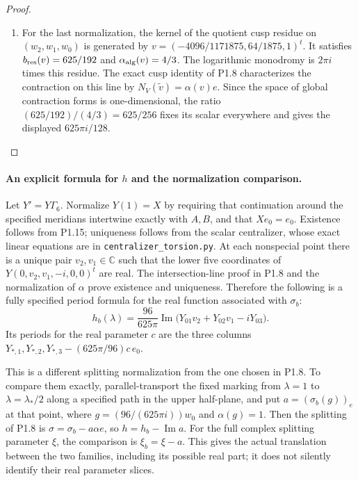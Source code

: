 \documentclass[11pt,a4paper]{article}
\theoremstyle{definition}
\begin{document}
\begin{proof}
\begin{enumerate}[label=\arabic*.]
\item For the last normalization, the kernel of the quotient cusp residue
on $(w_2,w_1,w_0)$ is generated by
$v=(-4096/1171875,64/1875,1)^t$.
It satisfies $b_{\rm res}(v)=625/192$ and
$\alpha_{\rm alg}(v)=4/3$.
The logarithmic monodromy is $2\pi i$ times this residue.
The exact cusp identity of P1.8 characterizes the contraction on this
line by $N_V(\widetilde v)=\alpha(v)e$.
Since the space of global contraction forms is one-dimensional, the
ratio $(625/192)/(4/3)=625/256$ fixes its scalar everywhere and gives
the displayed $625\pi i/128$.

\end{enumerate}
\end{proof}


\paragraph{An explicit formula for $h$ and the normalization comparison.}
Let $Y'=Y\Gamma_6$.  Normalize $Y(1)=X$ by requiring that continuation
around the specified meridians intertwine exactly with $A,B$, and that
$Xe_0=e_0$.  Existence follows from P1.15; uniqueness follows from the
scalar centralizer, whose exact linear equations are in
\texttt{centralizer\_torsion.py}.
At each nonspecial point there is a unique pair $v_2,v_1\in\mathbb C$
such that the lower five coordinates of
$Y(0,v_2,v_1,-i,0,0)^t$ are real.
The intersection-line proof in P1.8 and the normalization of $\alpha$
prove existence and uniqueness.  Therefore the following is a fully
specified period formula for the real function associated with
$\sigma_b$:
\[
h_b(\lambda)=\frac{96}{625\pi}
 \operatorname{Im}\bigl(Y_{01}v_2+Y_{02}v_1-iY_{03}\bigr).
\tag{1.15.3}
\]
Its periods for the real parameter $c$ are the three columns
$Y_{*,1},Y_{*,2},Y_{*,3}-(625\pi/96)c\,e_0$.

This is a different splitting normalization from the one chosen in
P1.8.  To compare them exactly, parallel-transport the fixed marking
from $\lambda=1$ to $\lambda=\lambda_*/2$ along a specified path in the
upper half-plane, and put
$a=(\sigma_b(g))_e$ at that point, where
$g=(96/(625\pi i))w_0$ and $\alpha(g)=1$.
Then the splitting of P1.8 is
$\sigma=\sigma_b-a\alpha e$, so $h=h_b-\operatorname{Im}a$.
For the full complex splitting parameter $\xi$, the comparison is
$\xi_b=\xi-a$.  This gives the actual translation between the two
families, including its possible real part; it does not silently
identify their real parameter slices.
\end{document}
